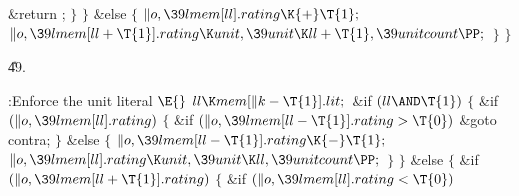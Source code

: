 \&{return} ;\6
\4${}\}{}$\2\6
\4${}\}{}$\5
\2\&{else}\5
${}\{{}$\1\6
${}\|o,\39\\{lmem}[\\{ll}].\\{rating}\K{+}\T{1};{}$\6
${}\|o,\39\\{lmem}[\\{ll}+\T{1}].\\{rating}\K\\{unit},\39\\{unit}\K\\{ll}+%
\T{1},\39\\{unitcount}\PP;{}$\6
\4${}\}{}$\2\6
\4${}\}{}$\2\par
\U49.\fi

\B{}:Enforce the unit literal \X${}%
\E{}$\6
$\\{ll}\K\\{mem}[\|k-\T{1}].\\{lit};{}$\6
\&{if} ${}(\\{ll}\AND\T{1}){}$\5
${}\{{}$\1\6
\&{if} ${}(\|o,\39\\{lmem}[\\{ll}].\\{rating}){}$\5
${}\{{}$\1\6
\&{if} ${}(\|o,\39\\{lmem}[\\{ll}-\T{1}].\\{rating}>\T{0}){}$\1\5
\&{goto} \\{contra};\2\6
\4${}\}{}$\5
\2\&{else}\5
${}\{{}$\1\6
${}\|o,\39\\{lmem}[\\{ll}-\T{1}].\\{rating}\K{-}\T{1};{}$\6
${}\|o,\39\\{lmem}[\\{ll}].\\{rating}\K\\{unit},\39\\{unit}\K\\{ll},\39%
\\{unitcount}\PP;{}$\6
\4${}\}{}$\2\6
\4${}\}{}$\5
\2\&{else}\5
${}\{{}$\1\6
\&{if} ${}(\|o,\39\\{lmem}[\\{ll}+\T{1}].\\{rating}){}$\5
${}\{{}$\1\6
\&{if} ${}(\|o,\39\\{lmem}[\\{ll}].\\{rating}<\T{0}){}$\5
